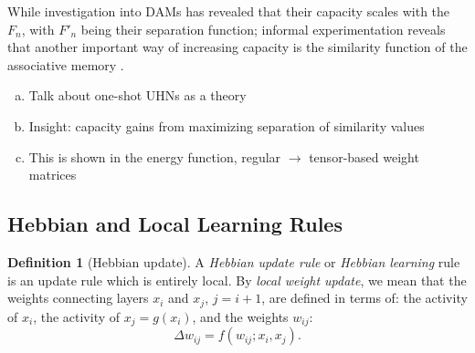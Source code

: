 \documentclass{article}
\theoremstyle{definition}
\newtheorem{definition}{Definition}[subsection]
\begin{document}
While investigation into DAMs has revealed that their capacity scales with 
the $F_n$, with $F'_n$ being their separation function; informal experimentation
reveals that another important way of increasing capacity is the similarity function
of the associative memory \parencites{millidge_predictive_2022,hu_provably_2024}.

\begin{enumerate}[(a)]
    \item Talk about one-shot UHNs as a theory
    \item Insight: capacity gains from maximizing separation of similarity values
    \item This is shown in the energy function, regular $\to$ tensor-based weight matrices
\end{enumerate}

\subsection{Hebbian and Local Learning Rules}\label{sec:hebb}

\begin{definition}[Hebbian update]
    A \textit{Hebbian update rule} or \textit{Hebbian learning} rule is an update
    rule which is entirely local. By \textit{local weight update}, we mean that 
    the weights connecting layers $x_i$ and $x_j$, $j = i + 1$, are defined 
    in terms of: the activity of $x_i$, the activity of $x_j = g(x_i)$, and
    the weights $w_{ij}$:
    \begin{equation}
    \Delta w_{ij} = f (w_{ij}; x_i, x_j).
    \end{equation}
\end{definition}
\end{document}
